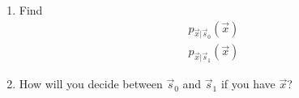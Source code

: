 \documentclass[journal,12pt,twocolumn]{IEEEtran}
\renewcommand\thesection{\arabic{section}}
\begin{document}
\begin{enumerate}[label=\thesection.\arabic*
,ref=\thesection.\theenumi]
%
where $\vec{s}\in \cbrak{\vec{s}_0,\vec{s}_1}$ and $\vec{n}\sim \mathcal{N}\brak{0,\sigma^2 \vec{I}}$, show 
that
\begin{align}
\mathbf{x}|0 = 
\begin{pmatrix*}
a + n_{1}\\
n_{2}
\end{pmatrix*},
\end{align}
and 
\begin{align}
\mathbf{x}|1 = 
\begin{pmatrix*}
n_{1}\\
a + n_{2}
\end{pmatrix*},
\end{align}
%
\item Find
\begin{align}
\label{eq:least_vecs}
p_{\vec{x}|\vec{s}_0}(\vec{x})
\\
p_{\vec{x}|\vec{s}_1}(\vec{x})
\end{align}
%
\item How will you decide between $\vec{s}_0$ and $\vec{s}_1$ if you have $\vec{x}$?
%
%
%
%
\end{enumerate}
\end{document}
